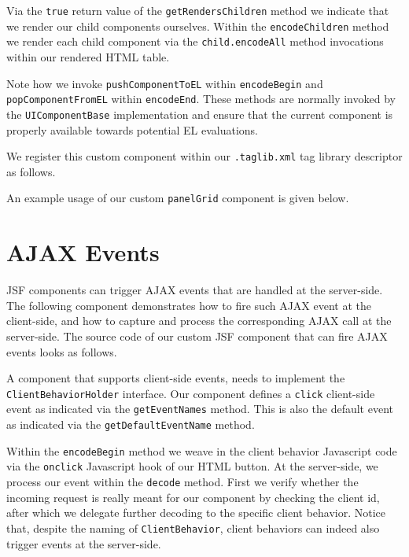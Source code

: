 Via the \texttt{true} return value of the \texttt{getRendersChildren} method we indicate that we render our child components ourselves.
Within the \texttt{encodeChildren} method we render each child component via the \texttt{child.encodeAll} method invocations within our rendered HTML table.

Note how we invoke \texttt{pushComponentToEL} within \texttt{encodeBegin} and \texttt{popComponentFromEL} within \texttt{encodeEnd}.
These methods are normally invoked by the \texttt{UIComponentBase} implementation and ensure that the current component is properly available towards potential EL evaluations.

We register this custom component within our \texttt{.taglib.xml} tag library descriptor as follows.


An example usage of our custom \texttt{panelGrid} component is given below.



\section{AJAX Events}
JSF components can trigger AJAX events that are handled at the server-side.
The following component demonstrates how to fire such AJAX event at the client-side, and how to capture and process the corresponding AJAX call at the server-side.
The source code of our custom JSF component that can fire AJAX events looks as follows.

A component that supports client-side events, needs to implement the \texttt{ClientBehavior\allowbreak Holder} interface.
Our component defines a \texttt{click} client-side event as indicated via the \texttt{getEvent\allowbreak  Names} method.
This is also the default event as indicated via the \texttt{getDefault\allowbreak EventName} method.

Within the \texttt{encodeBegin} method we weave in the client behavior Javascript code via the \texttt{onclick} Javascript hook of our HTML button.
At the server-side, we process our event within the \texttt{decode} method.
First we verify whether the incoming request is really meant for our component by checking the client id, after which we delegate further decoding to the specific client behavior.
Notice that, despite the naming of \texttt{ClientBehavior}, client behaviors can indeed also trigger events at the server-side.

